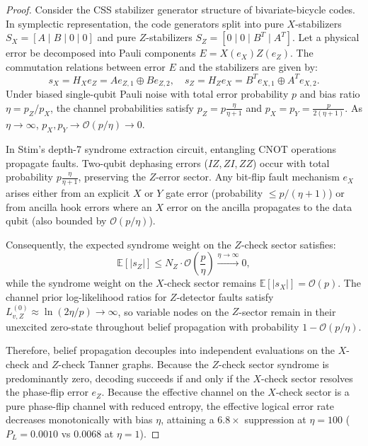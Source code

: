 \documentclass[journal]{IEEEtran}
\begin{document}
\begin{proof}
Consider the CSS stabilizer generator structure of bivariate-bicycle codes. In symplectic representation, the code generators split into pure $X$-stabilizers $S_X = [A \mid B \mid 0 \mid 0]$ and pure $Z$-stabilizers $S_Z = [0 \mid 0 \mid B^T \mid A^T]$. Let a physical error be decomposed into Pauli components $E = X(e_X) Z(e_Z)$. The commutation relations between error $E$ and the stabilizers are given by:
\begin{equation}
    s_X = H_X e_Z = A e_{Z,1} \oplus B e_{Z,2}, \quad s_Z = H_Z e_X = B^T e_{X,1} \oplus A^T e_{X,2}.
\end{equation}
Under biased single-qubit Pauli noise with total error probability $p$ and bias ratio $\eta = p_Z / p_X$, the channel probabilities satisfy $p_Z = p \frac{\eta}{\eta + 1}$ and $p_X = p_Y = \frac{p}{2(\eta + 1)}$. As $\eta \to \infty$, $p_X, p_Y \to \mathcal{O}(p/\eta) \to 0$.

In Stim's depth-7 syndrome extraction circuit, entangling CNOT operations propagate faults. Two-qubit dephasing errors ($IZ, ZI, ZZ$) occur with total probability $p \frac{\eta}{\eta+1}$, preserving the $Z$-error sector. Any bit-flip fault mechanism $e_X$ arises either from an explicit $X$ or $Y$ gate error (probability $\le p/(\eta+1)$) or from ancilla hook errors where an $X$ error on the ancilla propagates to the data qubit (also bounded by $\mathcal{O}(p/\eta)$).

Consequently, the expected syndrome weight on the $Z$-check sector satisfies:
\begin{equation}
    \mathbb{E}[|s_Z|] \le N_Z \cdot \mathcal{O}\left( \frac{p}{\eta} \right) \xrightarrow{\eta \to \infty} 0,
\end{equation}
while the syndrome weight on the $X$-check sector remains $\mathbb{E}[|s_X|] = \mathcal{O}(p)$. The channel prior log-likelihood ratios for $Z$-detector faults satisfy $L_{v, Z}^{(0)} \approx \ln(2\eta / p) \to \infty$, so variable nodes on the $Z$-sector remain in their unexcited zero-state throughout belief propagation with probability $1 - \mathcal{O}(p/\eta)$. 

Therefore, belief propagation decouples into independent evaluations on the $X$-check and $Z$-check Tanner graphs. Because the $Z$-check sector syndrome is predominantly zero, decoding succeeds if and only if the $X$-check sector resolves the phase-flip error $e_Z$. Because the effective channel on the $X$-check sector is a pure phase-flip channel with reduced entropy, the effective logical error rate decreases monotonically with bias $\eta$, attaining a $6.8\times$ suppression at $\eta = 100$ ($P_L = 0.0010$ vs $0.0068$ at $\eta=1$).
\end{proof}
\end{document}

